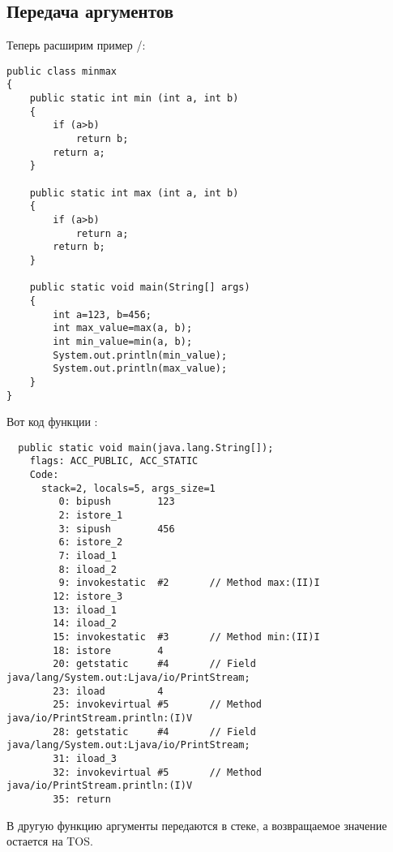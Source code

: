 \subsection{Передача аргументов}


Теперь расширим пример /:

\begin{lstlisting}[style=customjava]
public class minmax
{
	public static int min (int a, int b)
	{
		if (a>b)
			return b;
		return a;
	}

	public static int max (int a, int b)
	{
		if (a>b)
			return a;
		return b;
	}

	public static void main(String[] args)
	{
		int a=123, b=456;
		int max_value=max(a, b);
		int min_value=min(a, b);
		System.out.println(min_value);
		System.out.println(max_value);
	}
}
\end{lstlisting}


Вот код функции \main:

\begin{lstlisting}
  public static void main(java.lang.String[]);
    flags: ACC_PUBLIC, ACC_STATIC
    Code:
      stack=2, locals=5, args_size=1
         0: bipush        123
         2: istore_1      
         3: sipush        456
         6: istore_2      
         7: iload_1       
         8: iload_2       
         9: invokestatic  #2       // Method max:(II)I
        12: istore_3      
        13: iload_1       
        14: iload_2       
        15: invokestatic  #3       // Method min:(II)I
        18: istore        4
        20: getstatic     #4       // Field java/lang/System.out:Ljava/io/PrintStream;
        23: iload         4
        25: invokevirtual #5       // Method java/io/PrintStream.println:(I)V
        28: getstatic     #4       // Field java/lang/System.out:Ljava/io/PrintStream;
        31: iload_3       
        32: invokevirtual #5       // Method java/io/PrintStream.println:(I)V
        35: return        
\end{lstlisting}


В другую функцию аргументы передаются в стеке, а возвращаемое значение остается
на \ac{TOS}.

